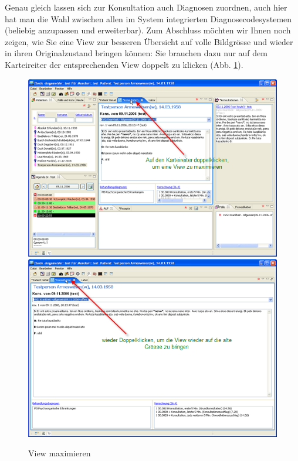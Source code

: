 Genau gleich lassen sich zur Konsultation auch Diagnosen zuordnen, auch hier hat man die Wahl zwischen allen im System integrierten
Diagnosecodesystemen (beliebig anzupassen und erweiterbar).
Zum Abschluss möchten wir Ihnen noch zeigen, wie Sie eine View zur besseren Übersicht auf volle Bildgrösse und wieder
in ihren Originalzustand bringen können: Sie brauchen dazu nur auf dem Karteireiter der entsprechenden View doppelt zu
klicken (Abb. \ref{fig:viewmax}).
\begin{figure}[ht]
	\includegraphics{images/einf8}
	\includegraphics{images/einf9}
	\caption{View maximieren}
	\label{fig:viewmax}
\end{figure}

